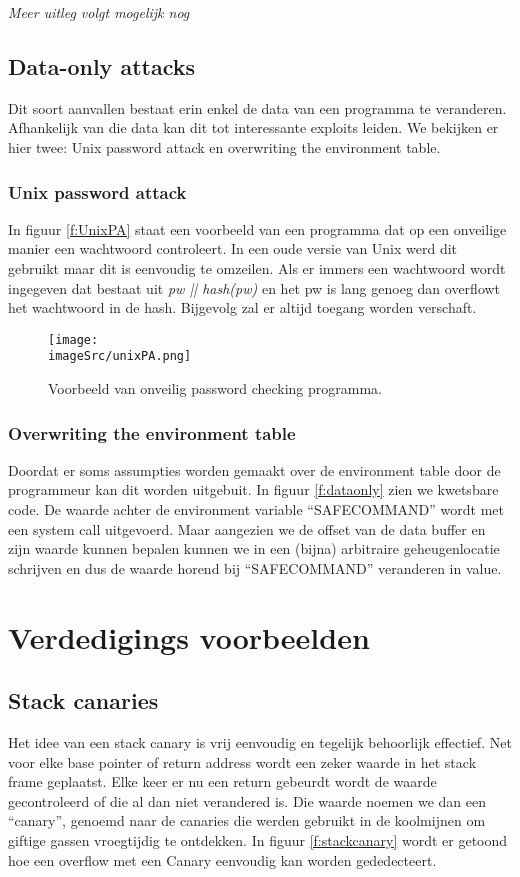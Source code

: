 \documentclass[../main.tex]{subfiles}
\begin{document}
\textit{Meer uitleg volgt mogelijk nog}



\subsection{Data-only attacks}
Dit soort aanvallen bestaat erin enkel de data van een programma te veranderen.
Afhankelijk van die data kan dit tot interessante exploits leiden.
We bekijken er hier twee: Unix password attack en overwriting the environment table.
\subsubsection{Unix password attack}
In figuur \ref{f:UnixPA} staat een voorbeeld van een programma dat op een onveilige manier een wachtwoord controleert.
In een oude versie van Unix werd dit gebruikt maar dit is eenvoudig te omzeilen.
Als er immers een wachtwoord wordt ingegeven dat bestaat uit \emph{pw || hash(pw)} en het pw is lang genoeg dan overflowt het wachtwoord in de hash.
Bijgevolg zal er altijd toegang worden verschaft.

\begin{figure}
\centering
\texttt{[image: \\imageSrc/unixPA.png]}
\caption{Voorbeeld van onveilig password checking programma.}
\label{f:unixPA}
\end{figure}

\subsubsection{Overwriting the environment table}
Doordat er soms assumpties worden gemaakt over de environment table door de programmeur kan dit worden uitgebuit.
In figuur \ref{f:dataonly} zien we kwetsbare code.
De waarde achter de environment variable ``SAFECOMMAND'' wordt met een system call uitgevoerd.
Maar aangezien we de offset van de data buffer en zijn waarde kunnen bepalen kunnen we in een (bijna) arbitraire geheugenlocatie schrijven en dus de waarde horend bij ``SAFECOMMAND'' veranderen in value.



\section{Verdedigings voorbeelden}
\subsection{Stack canaries}
Het idee van een stack canary is vrij eenvoudig en tegelijk behoorlijk effectief.
Net voor elke base pointer of return address wordt een zeker waarde in het stack frame geplaatst.
Elke keer er nu een return gebeurdt wordt de waarde gecontroleerd of die al dan niet verandered is.
Die waarde noemen we dan een ``canary'', genoemd naar de canaries die werden gebruikt in de koolmijnen om giftige gassen vroegtijdig te ontdekken.
In figuur \ref{f:stackcanary} wordt er getoond hoe een overflow met een Canary eenvoudig kan worden gededecteert.
\end{document}
